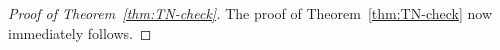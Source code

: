 \documentclass[letterpaper,11pt,reqno]{amsart}
\renewcommand{\le}{\leqslant}
\renewcommand{\ge}{\geqslant}
\newcommand{\abs}[1]{\left\vert#1\right\vert}
\newcommand{\mvgs}{{\sigma}}
\newcommand{\bP}{\mathbb{P}}\newcommand{\bQ}{\mathbb{Q}}\newcommand{\bR}{\mathbb{R}}
\begin{document}
\begin{proof}[Proof of Theorem~\ref{thm:TN-check}]
The proof of Theorem~\ref{thm:TN-check} now immediately follows.
\end{proof}











 
\end{document}
